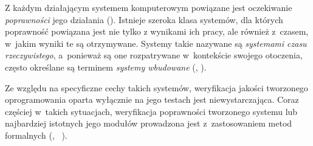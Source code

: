 \documentclass[a4paper,11pt]{book}
\begin{document}
Z każdym działającym systemem komputerowym powiązane jest oczekiwanie 
{\em poprawności} jego działania (\cite{Sommerville:2010:SE:1841764}). Istnieje szeroka 
klasa systemów, dla których poprawność powiązana jest nie tylko z 
wynikami ich pracy, ale również z~czasem, w~jakim wyniki te są 
otrzymywane. Systemy takie nazywane są {\em systemami czasu 
rzeczywistego}, a~ponieważ są one rozpatrywane  w~kontekście swojego 
otoczenia, często określane są terminem {\em systemy wbudowane} 
(\cite{Sommerville:2010:SE:1841764}, \cite{Szmuc:Szpyrka:i:inni}). 

Ze względu na specyficzne cechy takich systemów, weryfikacja jakości 
tworzonego oprogramowania oparta wyłącznie na jego testach jest 
niewystarczająca. Coraz częściej w~takich sytuacjach, weryfikacja 
poprawności tworzonego systemu lub najbardziej istotnych jego 
modułów prowadzona jest z~zastosowaniem metod formalnych 
(\cite{Alur:1990:AMR:90397.90438}, ~\cite{Szmuc:Szpyrka:i:inni}). 



\end{document}
